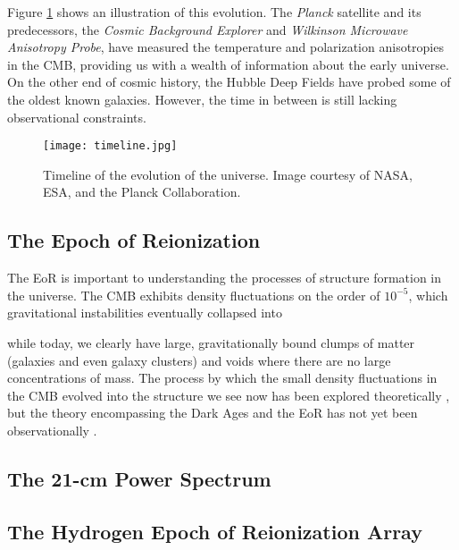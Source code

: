 \documentclass[12pt]{article}
\begin{document}
Figure \ref{fig:timeline} shows an illustration of this evolution. The \textit{Planck} satellite and its predecessors, the \textit{Cosmic Background Explorer} and \textit{Wilkinson Microwave Anisotropy Probe}, have measured the temperature and polarization anisotropies in the CMB, providing us with a wealth of information about the early universe. On the other end of cosmic history, the Hubble Deep Fields have probed some of the oldest known galaxies. However, the time in between is still lacking observational constraints. 

\begin{figure}[tb]
	\centering
	\texttt{[image: timeline.jpg]}
	\caption[Timeline of the universe]{Timeline of the evolution of the universe. Image courtesy of NASA, ESA, and the Planck Collaboration.}
	\label{fig:timeline}
\end{figure}

\subsection{The Epoch of Reionization} \label{subsec:eor}

The EoR is important to understanding the processes of structure formation in the universe. The CMB exhibits density fluctuations on the order of $10^{-5}$, which gravitational instabilities eventually collapsed into

while today, we clearly have large, gravitationally bound clumps of matter (galaxies and even galaxy clusters) and voids where there are no large concentrations of mass. The process by which the small density fluctuations in the CMB evolved into the structure we see now has been explored theoretically , but the theory encompassing the Dark Ages and the EoR has not yet been observationally .

\cite{furlanetto2006}

\cite{morales2010}

\cite{pritchard2012}

\subsection{The 21-cm Power Spectrum} \label{subsec:ps}

\subsection{The Hydrogen Epoch of Reionization Array} \label{subsec:hera}
\end{document}
